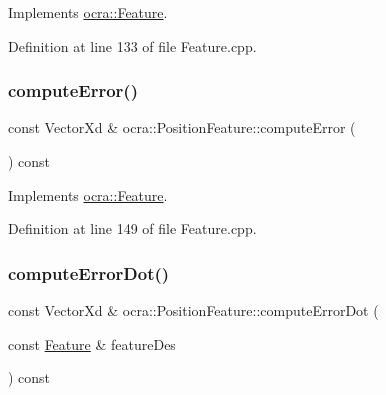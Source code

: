 Implements \hyperlink{classocra_1_1Feature_aaa74d6869f7e574fcc39d443581ddf77}{ocra\+::\+Feature}.



Definition at line 133 of file Feature.\+cpp.

\hypertarget{classocra_1_1PositionFeature_a5f89935f4b2f1b420e1dec19ed6692b5}{}\label{classocra_1_1PositionFeature_a5f89935f4b2f1b420e1dec19ed6692b5} 
\subsubsection{\texorpdfstring{compute\+Error()}{computeError()}\hspace{0.1cm}{\footnotesize\ttfamily [2/2]}}
{\footnotesize\ttfamily const Vector\+Xd \& ocra\+::\+Position\+Feature\+::compute\+Error (\begin{DoxyParamCaption}{ }\end{DoxyParamCaption}) const\hspace{0.3cm}{\ttfamily [virtual]}}



Implements \hyperlink{classocra_1_1Feature_a88f87b496aedc7bf9f13b19bb8f9c7fa}{ocra\+::\+Feature}.



Definition at line 149 of file Feature.\+cpp.

\hypertarget{classocra_1_1PositionFeature_a76887c9a378e9527e0afe6afad1e782b}{}\label{classocra_1_1PositionFeature_a76887c9a378e9527e0afe6afad1e782b} 
\subsubsection{\texorpdfstring{compute\+Error\+Dot()}{computeErrorDot()}\hspace{0.1cm}{\footnotesize\ttfamily [1/2]}}
{\footnotesize\ttfamily const Vector\+Xd \& ocra\+::\+Position\+Feature\+::compute\+Error\+Dot (\begin{DoxyParamCaption}\item[{const \hyperlink{classocra_1_1Feature}{Feature} \&}]{feature\+Des }\end{DoxyParamCaption}) const\hspace{0.3cm}{\ttfamily [virtual]}}



